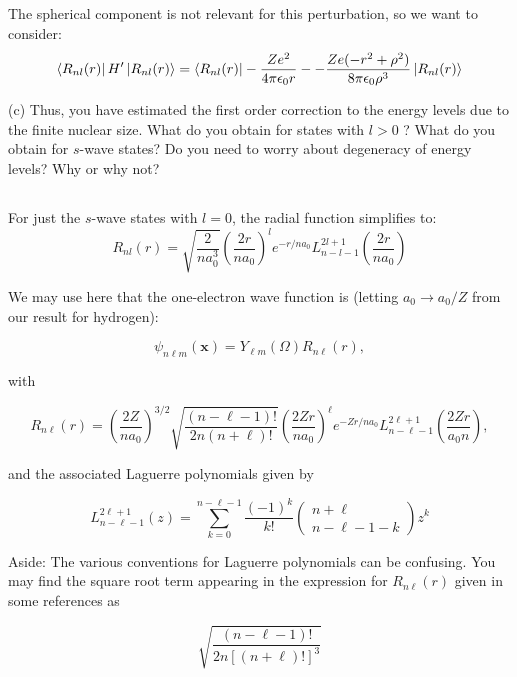\documentclass[12pt]{article}
\begin{document}
\subsection{}
The spherical component is not relevant for this perturbation, so we want to consider:
\begin{equation}
  \bra{R_{n l}(r)}H'\ket{R_{n l}(r)} = \bra{R_{n l}(r)}-\frac{Ze^2}{4\pi\epsilon_0 r} - -\frac{Ze(-r^2 + \rho^2)}{8\pi\epsilon_0\rho^3}\ket{R_{n l}(r)}
\end{equation}

(c) Thus, you have estimated the first order correction to the energy levels due to the finite nuclear size. What do you obtain for states with $l>0$ ? What do you obtain for $s$-wave states? Do you need to worry about degeneracy of energy levels? Why or why not?
\subsection{}
For just the $s$-wave states with $l = 0$, the radial function simplifies to:
\begin{equation}
  R_{n l}(r) = \sqrt{\frac{2}{n a_0^3}} \left( \frac{2r}{n a_0} \right)^{l} e^{-r / n a_{0}} L_{n-l-1}^{2l+1}\left(\frac{2 r}{n a_{0}}\right)
\end{equation}

We may use here that the one-electron wave function is (letting $a_{0} \rightarrow a_{0} / Z$ from our result for hydrogen):

$$
\psi_{n \ell m}(\mathbf{x})=Y_{\ell m}(\Omega) R_{n \ell}(r),
$$

with

$$
R_{n \ell}(r)=\left(\frac{2 Z}{n a_{0}}\right)^{3 / 2} \sqrt{\frac{(n-\ell-1) !}{2 n(n+\ell) !}}\left(\frac{2 Z r}{n a_{0}}\right)^{\ell} e^{-Z r / n a_{0}} L_{n-\ell-1}^{2 \ell+1}\left(\frac{2 Z r}{a_{0} n}\right),
$$

and the associated Laguerre polynomials given by

$$
L_{n-\ell-1}^{2 \ell+1}(z)=\sum_{k=0}^{n-\ell-1} \frac{(-1)^{k}}{k !}\left(\begin{array}{c}
n+\ell \\
n-\ell-1-k
\end{array}\right) z^{k}
$$

Aside: The various conventions for Laguerre polynomials can be confusing. You may find the square root term appearing in the expression for $R_{n \ell}(r)$ given in some references as

$$
\sqrt{\frac{(n-\ell-1) !}{2 n[(n+\ell) !]^{3}}}
$$
\end{document}
